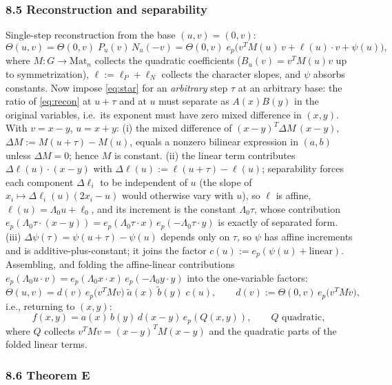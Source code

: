 \documentclass[11pt]{article}
\begin{document}
\subsubsection*{8.5 Reconstruction and separability}

Single-step reconstruction from the base $(u,v)=(0,v)$:
\begin{equation}\label{eq:recon}
\Theta(u,v)=\Theta(0,v)\;P_u(v)\,N_u(-v)
=\Theta(0,v)\;e_p\bigl(v^{T}M(u)\,v+\ell(u)\cdot v+\psi(u)\bigr),
\end{equation}
where $M:G\to\mathrm{Mat}_n$ collects the quadratic coefficients
($B_u(v)=v^{T}M(u)v$ up to symmetrization), $\ell:=\ell_P+\ell_N$ collects
the character slopes, and $\psi$ absorbs constants. Now impose
\eqref{eq:star} for an \emph{arbitrary} step $\tau$ at an arbitrary base: the
ratio of \eqref{eq:recon} at $u+\tau$ and at $u$ must separate as
$A(x)B(y)$ in the original variables, i.e.\ its exponent must have zero
mixed difference in $(x,y)$. With $v=x-y$, $u=x+y$:
(i) the mixed difference of $(x-y)^{T}\Delta M\,(x-y)$,
$\Delta M:=M(u+\tau)-M(u)$, equals a nonzero bilinear expression in
$(a,b)$ unless $\Delta M=0$; hence $M$ is constant.
(ii) the linear term contributes
$\Delta\ell(u)\cdot(x-y)$ with $\Delta\ell(u):=\ell(u+\tau)-\ell(u)$;
separability forces each component $\Delta\ell_i$ to be independent of $u$
(the slope of $x_i\mapsto\Delta\ell_i(u)(2x_i-u)$ would otherwise vary with
$u$), so $\ell$ is affine, $\ell(u)=\Lambda_0 u+\ell_0$, and its increment is
the constant $\Lambda_0\tau$, whose contribution
$e_p(\Lambda_0\tau\cdot(x-y))
=e_p(\Lambda_0\tau\cdot x)\,e_p(-\Lambda_0\tau\cdot y)$
is exactly of separated form.
(iii) $\Delta\psi(\tau)=\psi(u+\tau)-\psi(u)$ depends only on $\tau$, so
$\psi$ has affine increments and is additive-plus-constant; it joins the
factor $c(u):=e_p(\psi(u)+\text{linear})$.
Assembling, and folding the affine-linear contributions
$e_p(\Lambda_0 u\cdot v)=e_p(\Lambda_0 x\cdot x)\,e_p(-\Lambda_0 y\cdot y)$
into the one-variable factors:
\[
\Theta(u,v)=d(v)\,e_p\bigl(v^{T}Mv\bigr)\;\tilde a(x)\;\tilde b(y)\;c(u),
\qquad d(v):=\Theta(0,v)\,e_p\bigl(v^{T}Mv\bigr),
\]
i.e., returning to $(x,y)$:
\[
f(x,y)=a(x)\,b(y)\,d(x-y)\,e_p(Q(x,y)),
\qquad Q \text{ quadratic},
\]
where $Q$ collects $v^{T}Mv=(x-y)^{T}M(x-y)$ and the quadratic parts of the
folded linear terms.

\subsubsection*{8.6 Theorem E}
\end{document}

